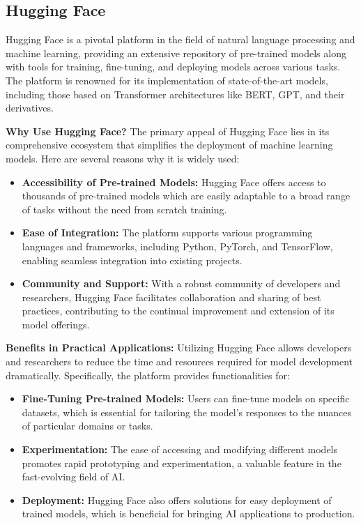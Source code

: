 \documentclass[conference]{IEEEtran}
\begin{document}
\subsection{Hugging Face}%
Hugging Face is a pivotal platform in the field of natural language processing and machine learning, providing an extensive repository of pre-trained models along with tools for training, fine-tuning, and deploying models across various tasks. The platform is renowned for its implementation of state-of-the-art models, including those based on Transformer architectures like BERT, GPT, and their derivatives.

\textbf{Why Use Hugging Face?} The primary appeal of Hugging Face lies in its comprehensive ecosystem that simplifies the deployment of machine learning models. Here are several reasons why it is widely used:
\begin{itemize}
    \item \textbf{Accessibility of Pre-trained Models:} Hugging Face offers access to thousands of pre-trained models which are easily adaptable to a broad range of tasks without the need from scratch training.
    \item \textbf{Ease of Integration:} The platform supports various programming languages and frameworks, including Python, PyTorch, and TensorFlow, enabling seamless integration into existing projects.
    \item \textbf{Community and Support:} With a robust community of developers and researchers, Hugging Face facilitates collaboration and sharing of best practices, contributing to the continual improvement and extension of its model offerings.
\end{itemize}

\textbf{Benefits in Practical Applications:} Utilizing Hugging Face allows developers and researchers to reduce the time and resources required for model development dramatically. Specifically, the platform provides functionalities for:
\begin{itemize}
    \item \textbf{Fine-Tuning Pre-trained Models:} Users can fine-tune models on specific datasets, which is essential for tailoring the model's responses to the nuances of particular domains or tasks.
    \item \textbf{Experimentation:} The ease of accessing and modifying different models promotes rapid prototyping and experimentation, a valuable feature in the fast-evolving field of AI.
    \item \textbf{Deployment:} Hugging Face also offers solutions for easy deployment of trained models, which is beneficial for bringing AI applications to production.
\end{itemize}
\end{document}
